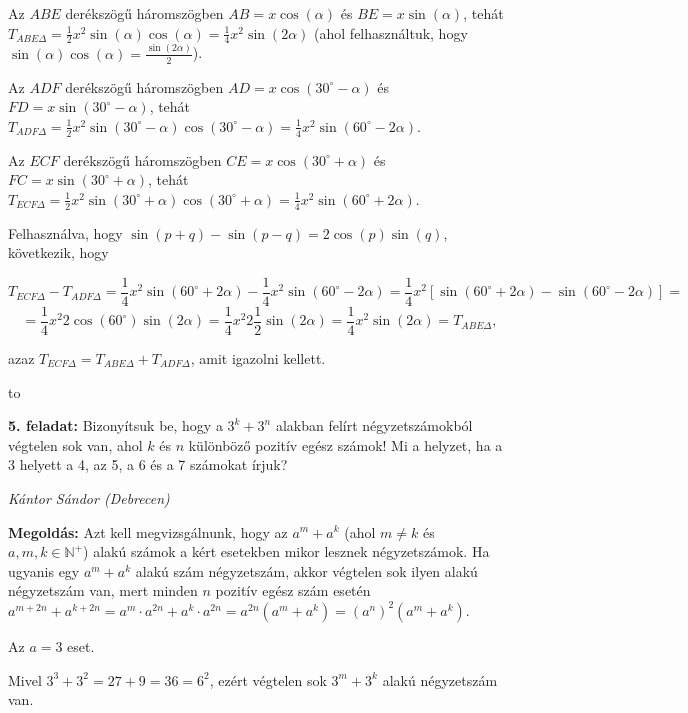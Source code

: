 \documentclass[a4paper,10pt]{article}
\newcommand{\ki}[2]{\hfill {\it #1 (#2)}\medskip}
\newcommand{\vonal}{\hbox to \hsize{\hskip2truecm\hrulefill\hskip2truecm}}
\begin{document}
Az $ABE$ derékszögű háromszögben
$AB = x\cos(\alpha)$ és
$BE = x\sin(\alpha)$, tehát
$T_{ABE\Delta} = \frac{1}{2}x^2\sin(\alpha)\cos(\alpha) = 
\frac{1}{4}x^2\sin(2\alpha)$ 
(ahol felhasználtuk, hogy $\sin( \alpha  ) \cos( \alpha  ) =
\frac{\sin(2\alpha)}{2}$).

Az $ADF$ derékszögű háromszögben 
$AD = x\cos( 30 ^\circ  - \alpha  )$ 
és 
$FD = x \sin( 30 ^\circ  - \alpha  )$, tehát
$T_{ADF\Delta} = \frac 12 x^2 \sin( 30 ^\circ  - \alpha)\cos( 30 ^\circ-\alpha) = \frac 14 x^2 \sin( 60 ^\circ  - 2 \alpha)$.

Az $ECF$ derékszögű háromszögben $CE = x \cos( 30 ^\circ+\alpha)$ és 
$FC = x\sin( 30 ^\circ+\alpha)$, tehát
$T_{ECF\Delta}= \frac 12 x^2 \sin( 30 ^\circ  + \alpha  ) \cos( 30 ^\circ  + \alpha  ) = \frac 14 x^2 \sin( 60 ^\circ  + 2 \alpha  )$.

Felhasználva, hogy $\sin( p + q ) - \sin( p - q ) = 
2 \cos( p ) \sin( q )$, következik, hogy

$$T_{ECF\Delta}-T_{ADF\Delta} =\frac{1}{4}
x^2 \sin( 60 ^\circ  + 2 \alpha  ) -\frac{1}{4} x^2 \sin( 60 ^\circ  - 2 \alpha  ) = 
\frac 14 x^2\left[ \sin( 60 ^\circ  + 2 \alpha  ) - \sin( 60 ^\circ  - 2 \alpha  )\right] =$$
$$= \frac 14 x^2 2 \cos( 60 ^\circ  ) \sin( 2 \alpha  ) 
= \frac 14 x^2 2 \frac{1}{2} \sin( 2 \alpha  ) 
= \frac 14 x^2 \sin( 2 \alpha  ) = T_{ABE\Delta},$$

azaz $T_{ECF\Delta} = T_{ABE\Delta}+T_{ADF\Delta}$, amit igazolni kellett.

\medskip

\vonal

{\bf 5. feladat:} Bizonyítsuk be, hogy a $3^k+3^n$ alakban felírt négyzetszámokból végtelen
sok van, ahol $k$ és $n$ különböző pozitív egész számok! Mi a helyzet, ha a 3 helyett a 4, az 5, a
6 és a 7 számokat írjuk?
 
\ki{Kántor Sándor }{Debrecen}\medskip

{\bf Megoldás:} Azt kell megvizsgálnunk, hogy 
az $a^m+a^k$ (ahol $m \ne k$ és $a, m, k \in \mathbb{N}^{+}$) alakú
számok a kért esetekben mikor lesznek négyzetszámok. Ha ugyanis 
egy $a^m+a^k$ alakú szám
négyzetszám, akkor végtelen sok ilyen alakú négyzetszám van, mert minden $n$ pozitív egész
szám esetén 
$a^{m+2n}+a^{k+2n} = a^m \cdot a^{2n}+a^k \cdot a ^{2n} 
= a^{2n}\left(a^m+a^k\right) = 
\left(a^n\right)^2\left(a^m+a^k\right)$.

\medskip
Az $a = 3$ eset.

Mivel $3^3+3^2 = 27 + 9 = 36 = 6^2$, 
ezért végtelen sok $3^m+3^k$ alakú négyzetszám van.
\end{document}

